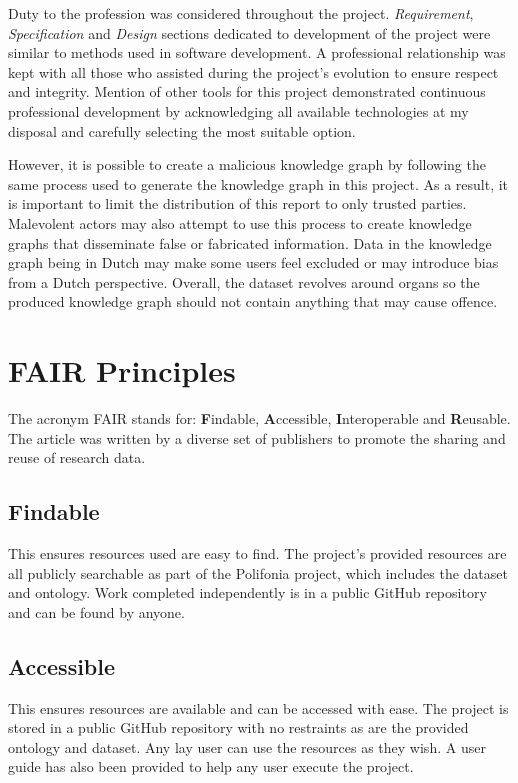 Duty to the profession was considered throughout the project. \textit{Requirement}, \textit{Specification} and \textit{Design} sections dedicated to development of the project were similar to methods used in software development. A professional relationship was kept with all those who assisted during the project's evolution to ensure respect and integrity. Mention of other tools for this project demonstrated continuous professional development by acknowledging all available technologies at my disposal and carefully selecting the most suitable option. 

However, it is possible to create a malicious knowledge graph by following the same process used to generate the knowledge graph in this project. As a result, it is important to limit the distribution of this report to only trusted parties. Malevolent actors may also attempt to use this process to create knowledge graphs that disseminate false or fabricated information. Data in the knowledge graph being in Dutch may make some users feel excluded or may introduce bias from a Dutch perspective. Overall, the dataset revolves around organs so the produced knowledge graph should not contain anything that may cause offence.

\section{FAIR Principles}
\hspace{0.5cm} The acronym FAIR stands for: \textbf{F}indable, \textbf{A}ccessible, \textbf{I}nteroperable and \textbf{R}eusable. The article \cite{fairprinciples} was written by a diverse set of publishers to promote the sharing and reuse of research data. 

\subsection{Findable}
\hspace{0.5cm} This ensures resources used are easy to find. The project's provided resources are all publicly searchable as part of the Polifonia project, which includes the dataset and ontology. Work completed independently is in a public GitHub repository and can be found by anyone. 

\subsection{Accessible}
\hspace{0.5cm} This ensures resources are available and can be accessed with ease. The project is stored in a public GitHub repository with no restraints as are the provided ontology and dataset. Any lay user can use the resources as they wish. A user guide has also been provided to help any user execute the project. 

